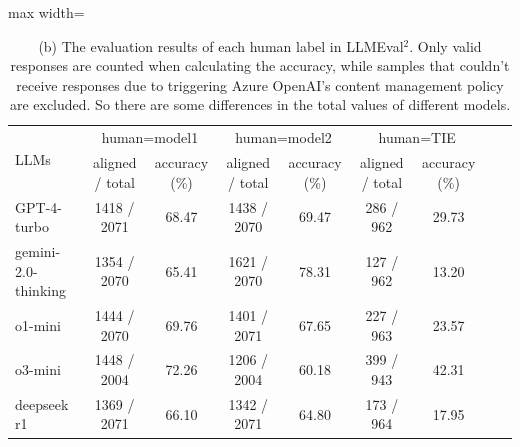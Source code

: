 \begin{table}[t]
    \begin{minipage}{\linewidth}
        \begin{adjustbox}{max width=\textwidth}
        \begin{tabular}{lcccccccc}
            \toprule
             \multirow{2}{*}{LLMs} & \multicolumn{2}{c}{human=model1} & \multicolumn{2}{c}{human=model2} & \multicolumn{2}{c}{human=TIE} \\
             & aligned / total & accuracy (\%) & aligned / total & accuracy (\%) & aligned / total & accuracy (\%) \\
            \midrule
            GPT-4-turbo & 1418 / 2071 & 68.47 & 1438 / 2070 & 69.47 & 286 / 962 & 29.73 \\
            
            gemini-2.0-thinking & 1354 / 2070 & 65.41 & 1621 / 2070 & 78.31 & 127 / 962 & 13.20 \\
            
            o1-mini & 1444 / 2070 & 69.76 & 1401 / 2071 & 67.65 & 227 / 963 & 23.57 \\
    
            o3-mini & 1448 / 2004 & 72.26 & 1206 / 2004 & 60.18 & 399 / 943 & 42.31 \\
    
            deepseek r1 & 1369 / 2071 & 66.10 & 1342 / 2071 & 64.80 & 173 / 964 & 17.95 \\
            \bottomrule
        \end{tabular}
        \end{adjustbox}
        \caption*{(b) The evaluation results of each human label in LLMEval$^2$. Only valid responses are counted when calculating the accuracy, while samples that couldn't receive responses due to triggering Azure OpenAI's content management policy are excluded. So there are some differences in the total values of different models.}\label{tb:exp_results_llmeval2_detail}
    \end{minipage}


\end{table}
